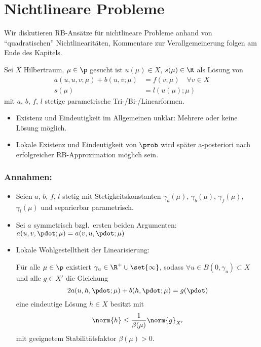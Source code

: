 \section{Nichtlineare Probleme}
\label{sec-5}

Wir diskutieren RB-Ansätze für nichtlineare Probleme anhand von ``quadratischen'' Nichtlinearitäten, Kommentare zur Verallgemeinerung folgen am Ende des Kapitels.

\begin{defn}
	Sei $X$ Hilbertraum, $\mu \in \p$ gesucht ist $u(\mu) \in X$, $s(\mu) \in \R$ als Lösung von
	\begin{align*}
		a(u,u,v;\mu) + b(u,v;\mu) &= f(v;\mu) \quad \forall v \in X\\
		s(\mu) &= l(u(\mu);\mu)
	\end{align*}
	mit $a$, $b$, $f$, $l$ stetige parametrische Tri-/Bi-/Linearformen.
\end{defn}

\begin{bem}[Wohlgestelltheit] \beginwithlistbem
	\begin{itemize}
		\item Existenz und Eindeutigkeit im Allgemeinen unklar: Mehrere oder keine Lösung möglich.
		\item Lokale Existenz und Eindeutigkeit von $\prob$ wird später a-posteriori nach erfolgreicher RB-Approximation möglich sein.
	\end{itemize}
\end{bem}

\subsubsection*{Annahmen:}
\begin{itemize}
	\item Seien $a$, $b$, $f$, $l$ stetig mit Stetigkeitskonstanten $\gamma_a(\mu)$, $\gamma_b(\mu)$, $\gamma_f(\mu)$, $\gamma_l(\mu)$ und separierbar parametrisch.
	\item Sei $a$ symmetrisch bzgl.\ ersten beiden Argumenten: $a(u,v,\pdot;\mu) = a(v,u,\pdot;\mu)$
	\item Lokale Wohlgestelltheit der Linearisierung:

		Für alle $\mu \in \p$ existiert $\gamma_u \in \R^+ \cup \set{\infty}$, sodass $\forall u \in B(0,\gamma_u) \subset X$ und alle $g \in X'$ die Gleichung
		\begin{equation}
			2a(u,h,\pdot;\mu) + b(h,\pdot;\mu) = g(\pdot)
			\label{eq:5.1}
		\end{equation}
		eine eindeutige Lösung $h \in X$ besitzt mit
		\[
			\norm{h} \leq \frac{1}{\beta(\mu)} \norm{g}_{X'}
		\]
		mit geeignetem Stabilitätsfaktor $\beta(\mu) > 0$.
\end{itemize}

